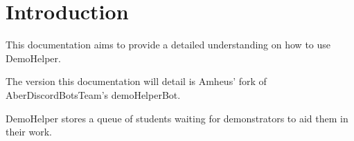 
\section{Introduction}
This documentation aims to provide a detailed understanding on how to use DemoHelper.

The version this documentation will detail is Amheus' fork of AberDiscordBotsTeam's demoHelperBot.


DemoHelper stores a queue of students waiting for demonstrators to aid them in their work.
